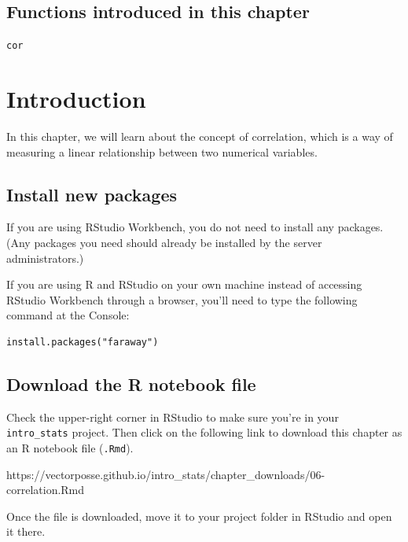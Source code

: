 \documentclass[
]{book}
\begin{document}
\hypertarget{functions-introduced-in-this-chapter-5}{%
\subsection*{Functions introduced in this chapter}\label{functions-introduced-in-this-chapter-5}}

\texttt{cor}

\hypertarget{correlation-intro}{%
\section{Introduction}\label{correlation-intro}}

In this chapter, we will learn about the concept of correlation, which is a way of measuring a linear relationship between two numerical variables.

\hypertarget{correlation-install}{%
\subsection{Install new packages}\label{correlation-install}}

If you are using RStudio Workbench, you do not need to install any packages. (Any packages you need should already be installed by the server administrators.)

If you are using R and RStudio on your own machine instead of accessing RStudio Workbench through a browser, you'll need to type the following command at the Console:

\begin{verbatim}
install.packages("faraway")
\end{verbatim}

\hypertarget{correlation-download}{%
\subsection{Download the R notebook file}\label{correlation-download}}

Check the upper-right corner in RStudio to make sure you're in your \texttt{intro\_stats} project. Then click on the following link to download this chapter as an R notebook file (\texttt{.Rmd}).

https://vectorposse.github.io/intro\_stats/chapter\_downloads/06-correlation.Rmd

Once the file is downloaded, move it to your project folder in RStudio and open it there.
\end{document}
